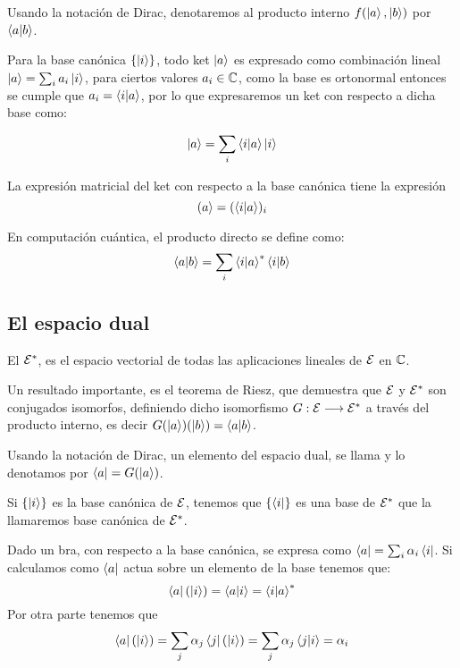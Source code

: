 Usando la notación de Dirac, denotaremos al producto interno $f(\ket{a}, \ket{b})$ por $\braket{a}{b}$.

Para la base canónica $\qty{\ket{i}}$, todo ket $\ket{a}$ es expresado como combinación lineal $\ket{a}=\sum_{i} a_i\ket{i}$, para ciertos valores $a_i\in\mathbb{C}$, como la base es ortonormal entonces se cumple que $a_i=\braket{i}{a}$, por lo que expresaremos un ket con respecto a dicha base como:

\begin{equation}
	\label{eq:ket-dirac}
	\ket{a}=\sum_i\braket{i}{a}\ket{i}
\end{equation}

La expresión matricial del ket con respecto a la base canónica tiene la expresión
\begin{equation}
	\label{eq:ket-matriz}
	\left(a\right>=(\braket{i}{a})_i
\end{equation}

En computación cuántica, el producto directo se define como:
\begin{equation}
	\label{eq:producto-interno-definicion}
	\braket{a}{b}=\sum_i \braket{i}{a}^*\braket{i}{b}
\end{equation}

\subsection{El espacio dual}\label{subsec:el-espacio-dual}
El  $\mathcal{E}^*$, es el espacio vectorial de todas las aplicaciones lineales de $\mathcal{E}$ en $\mathbb{C}$.

Un resultado importante, es el teorema de Riesz, que demuestra que $\mathcal{E}$ y $\mathcal{E}^*$ son conjugados isomorfos, definiendo dicho isomorfismo $G:\mathcal{E}\longrightarrow \mathcal{E}^*$ a través del producto interno, es decir $G(\ket{a})(\ket{b})=\braket{a}{b}$.

Usando la notación de Dirac, un elemento del espacio dual, se llama  y lo denotamos por $\bra{a}=G(\ket{a})$.

Si $\qty{\ket{i}}$ es la base canónica de $\mathcal{E}$, tenemos que $\qty{\bra{i}}$ es una base de $\mathcal{E}^*$ que la llamaremos base canónica de $\mathcal{E}^*$.

Dado un bra, con respecto a la base canónica, se expresa como $\bra{a}=\sum_{i}\alpha_i\bra{i}$.
Si calculamos como $\bra{a}$ actua sobre un elemento de la base tenemos que:
\begin{equation*}
	\bra{a}(\ket{i})=\braket{a}{i}= \braket{i}{a}^*
\end{equation*}
Por otra parte tenemos que
\begin{equation*}
	\bra{a}(\ket{i})=\sum_{j}\alpha_j\bra{j}(\ket{i}) = \sum_{j}\alpha_j\braket{j}{i} = \alpha_i
\end{equation*}

